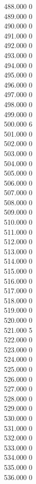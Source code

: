 { 488.000	0 \\
 489.000	0 \\
 490.000	0 \\
 491.000	0 \\
 492.000	0 \\
 493.000	0 \\
 494.000	0 \\
 495.000	0 \\
 496.000	0 \\
 497.000	0 \\
 498.000	0 \\
 499.000	0 \\
 500.000	6 \\
 501.000	0 \\
 502.000	0 \\
 503.000	0 \\
 504.000	0 \\
 505.000	0 \\
 506.000	0 \\
 507.000	0 \\
 508.000	0 \\
 509.000	0 \\
 510.000	0 \\
 511.000	0 \\
 512.000	0 \\
 513.000	0 \\
 514.000	0 \\
 515.000	0 \\
 516.000	0 \\
 517.000	0 \\
 518.000	0 \\
 519.000	0 \\
 520.000	0 \\
 521.000	5 \\
 522.000	0 \\
 523.000	0 \\
 524.000	0 \\
 525.000	0 \\
 526.000	0 \\
 527.000	0 \\
 528.000	0 \\
 529.000	0 \\
 530.000	0 \\
 531.000	0 \\
 532.000	0 \\
 533.000	0 \\
 534.000	0 \\
 535.000	0 \\
 536.000	0 \\
}
